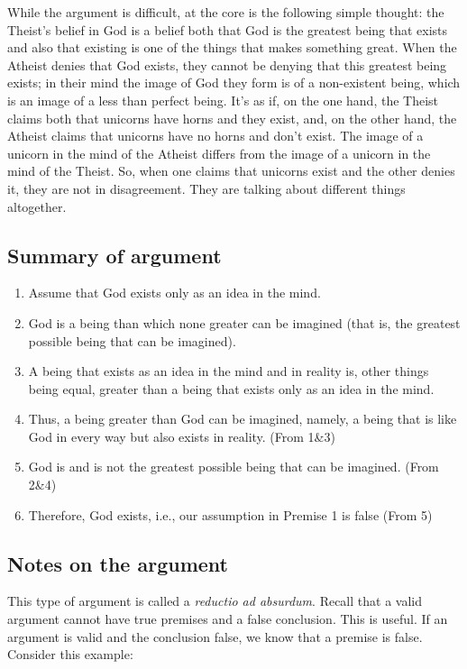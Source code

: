 \documentclass[]{article}
\begin{document}
While the argument is difficult, at the core is the following simple
thought: the Theist's belief in God is a belief both that God is the
greatest being that exists and also that existing is one of the things
that makes something great. When the Atheist denies that God exists,
they cannot be denying that this greatest being exists; in their mind
the image of God they form is of a non-existent being, which is an image
of a less than perfect being. It's as if, on the one hand, the Theist
claims both that unicorns have horns and they exist, and, on the other
hand, the Atheist claims that unicorns have no horns and don't exist.
The image of a unicorn in the mind of the Atheist differs from the image
of a unicorn in the mind of the Theist. So, when one claims that
unicorns exist and the other denies it, they are not in disagreement.
They are talking about different things altogether.

\subsection{Summary of argument}\label{summary-of-argument}

\begin{enumerate}
\def\labelenumi{\arabic{enumi}.}
\itemsep1pt\parskip0pt
\item
  Assume that God exists only as an idea in the mind.
\item
  God is a being than which none greater can be imagined (that is, the
  greatest possible being that can be imagined).
\item
  A being that exists as an idea in the mind and in reality is, other
  things being equal, greater than a being that exists only as an idea
  in the mind.
\item
  Thus, a being greater than God can be imagined, namely, a being that
  is like God in every way but also exists in reality. (From 1\&3)
\item
  God is and is not the greatest possible being that can be imagined.
  (From 2\&4)
\item
  Therefore, God exists, i.e., our assumption in Premise 1 is false
  (From 5)
\end{enumerate}

\subsection{Notes on the argument}\label{notes-on-the-argument}

This type of argument is called a \emph{reductio ad absurdum}. Recall
that a valid argument cannot have true premises and a false conclusion.
This is useful. If an argument is valid and the conclusion false, we
know that a premise is false. Consider this example:
\end{document}
